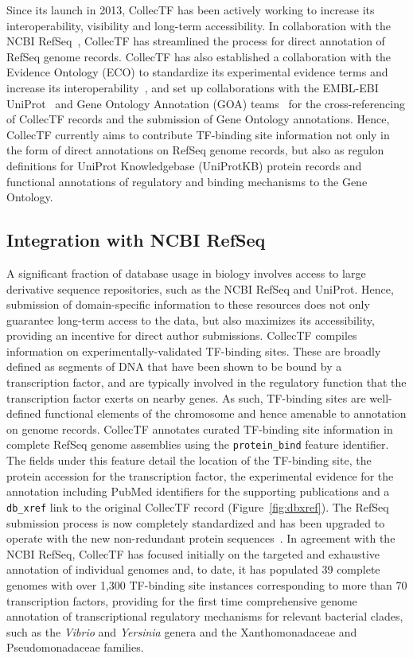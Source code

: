 Since its launch in 2013, CollecTF has been actively working to increase its
interoperability, visibility and long-term accessibility. In collaboration with
the NCBI RefSeq~\citep{pruitt2007ncbi}, CollecTF has streamlined the process for
direct annotation of RefSeq genome records. CollecTF has also established a
collaboration with the Evidence Ontology (ECO) to standardize its experimental
evidence terms and increase its
interoperability~\citep{chibucos2014standardized}, and set up collaborations
with the EMBL-EBI UniProt~\citep{uniprot2014uniprot} and Gene Ontology
Annotation (GOA) teams~\citep{ashburner2000gene} for the cross-referencing of
CollecTF records and the submission of Gene Ontology annotations. Hence,
CollecTF currently aims to contribute TF-binding site information not only in
the form of direct annotations on RefSeq genome records, but also as regulon
definitions for UniProt Knowledgebase (UniProtKB) protein records and
functional annotations of regulatory and binding mechanisms to the Gene
Ontology.


\subsection{Integration with NCBI RefSeq}

A significant fraction of database usage in biology involves access to large
derivative sequence repositories, such as the NCBI RefSeq and UniProt. Hence,
submission of domain-specific information to these resources does not only
guarantee long-term access to the data, but also maximizes its accessibility,
providing an incentive for direct author submissions. CollecTF compiles
information on experimentally-validated TF-binding sites. These are broadly
defined as segments of DNA that have been shown to be bound by a transcription
factor, and are typically involved in the regulatory function that the
transcription factor exerts on nearby genes. As such, TF-binding sites are
well-defined functional elements of the chromosome and hence amenable to
annotation on genome records. CollecTF annotates curated TF-binding site
information in complete RefSeq genome assemblies using the \verb|protein_bind|
feature identifier. The fields under this feature detail the location of the
TF-binding site, the protein accession for the transcription factor, the
experimental evidence for the annotation including PubMed identifiers for the
supporting publications and a \verb|db_xref| link to the original CollecTF
record (Figure~\ref{fig:dbxref}). The RefSeq submission process is now completely standardized
and has been upgraded to operate with the new non-redundant protein
sequences~\citep{o2015reference}. In agreement with the NCBI RefSeq, CollecTF
has focused initially on the targeted and exhaustive annotation of individual
genomes and, to date, it has populated 39 complete genomes with over 1,300
TF-binding site instances corresponding to more than 70 transcription factors,
providing for the first time comprehensive genome annotation of transcriptional
regulatory mechanisms for relevant bacterial clades, such as the
\textit{Vibrio} and \textit{Yersinia} genera and the Xanthomonadaceae and
Pseudomonadaceae families.

